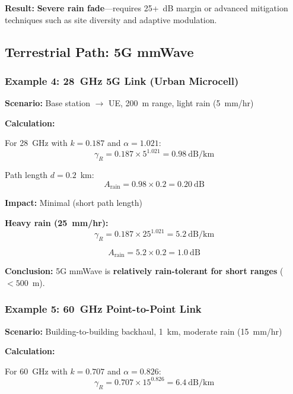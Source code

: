 \textbf{Result:} \textbf{Severe rain fade}---requires 25+~dB margin or advanced mitigation techniques such as site diversity and adaptive modulation.

\subsection{Terrestrial Path: 5G mmWave}

\subsubsection{Example 4: 28~GHz 5G Link (Urban Microcell)}

\textbf{Scenario:} Base station $\rightarrow$ UE, 200~m range, light rain (5~mm/hr)

\textbf{Calculation:}

For 28~GHz with $k = 0.187$ and $\alpha = 1.021$:
\begin{equation}
\gamma_R = 0.187 \times 5^{1.021} = 0.98~\text{dB/km}
\end{equation}

Path length $d = 0.2$~km:
\begin{equation}
A_{\text{rain}} = 0.98 \times 0.2 = 0.20~\text{dB}
\end{equation}

\textbf{Impact:} Minimal (short path length)

\textbf{Heavy rain (25~mm/hr):}
\begin{equation}
\gamma_R = 0.187 \times 25^{1.021} = 5.2~\text{dB/km}
\end{equation}

\begin{equation}
A_{\text{rain}} = 5.2 \times 0.2 = 1.0~\text{dB}
\end{equation}

\textbf{Conclusion:} 5G mmWave is \textbf{relatively rain-tolerant for short ranges} ($< 500$~m).

\subsubsection{Example 5: 60~GHz Point-to-Point Link}

\textbf{Scenario:} Building-to-building backhaul, 1~km, moderate rain (15~mm/hr)

\textbf{Calculation:}

For 60~GHz with $k = 0.707$ and $\alpha = 0.826$:
\begin{equation}
\gamma_R = 0.707 \times 15^{0.826} = 6.4~\text{dB/km}
\end{equation}

